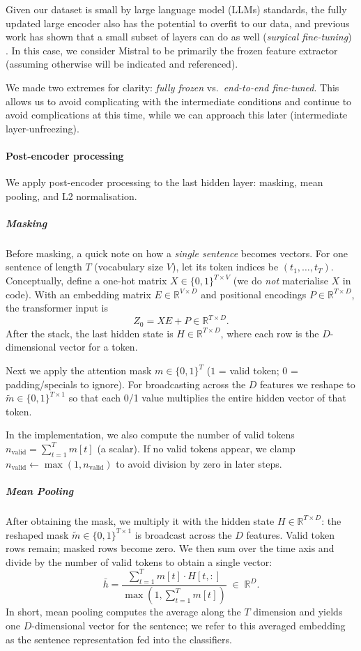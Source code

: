 \documentclass[12pt]{article}
\begin{document}
Given our dataset is small by large language model (LLMs) standards, the fully updated large encoder also has the potential to overfit to our data, and previous work has shown that a small subset of layers can do as well (\emph{surgical fine-tuning}) \cite{lodha2023surgical}. In this case, we consider Mistral to be primarily the frozen feature extractor (assuming otherwise will be indicated and referenced). 

We made two extremes for clarity: \emph{fully frozen} vs.\ \emph{end-to-end fine-tuned}. This allows us to avoid complicating with the intermediate conditions and continue to avoid complications at this time, while we can approach this later (intermediate layer-unfreezing).

\paragraph{Post-encoder processing}

We apply post-encoder processing to the last hidden layer: masking, mean pooling, and L2 normalisation.

%
\subparagraph{Masking}
Before masking, a quick note on how a \emph{single sentence} becomes vectors. For one sentence of length $T$ (vocabulary size $V$), let its token indices be $(t_1,\ldots,t_T)$. Conceptually, define a one-hot matrix $X \in \{0,1\}^{T \times V}$ (we do \emph{not} materialise $X$ in code). With an embedding matrix $E \in \mathbb{R}^{V \times D}$ and positional encodings $P \in \mathbb{R}^{T \times D}$, the transformer input is
\[
Z_0 = X E + P \in \mathbb{R}^{T \times D}.
\]
After the stack, the last hidden state is $H \in \mathbb{R}^{T \times D}$, where each row is the $D$-dimensional vector for a token.

Next we apply the attention mask $m \in \{0,1\}^{T}$ ($1$ = valid token; $0$ = padding/specials to ignore). For broadcasting across the $D$ features we reshape to $\tilde{m} \in \{0,1\}^{T \times 1}$ so that each 0/1 value multiplies the entire hidden vector of that token.

In the implementation, we also compute the number of valid tokens $n_{\mathrm{valid}} = \sum_{t=1}^{T} m[t]$ (a scalar). If no valid tokens appear, we clamp $n_{\mathrm{valid}} \leftarrow \max(1, n_{\mathrm{valid}})$ to avoid division by zero in later steps.

%
\subparagraph{Mean Pooling}
After obtaining the mask, we multiply it with the hidden state $H \in \mathbb{R}^{T \times D}$:
the reshaped mask $\tilde{m} \in \{0,1\}^{T \times 1}$ is broadcast across the $D$ features. Valid token rows remain; masked rows become zero. We then sum over the time axis and divide by the number of valid tokens to obtain a single vector:
\begin{equation}
\bar{h}
= \frac{\displaystyle \sum_{t=1}^{T} m[t] \cdot H[t,:]}
{\displaystyle \max\!\left(1, \sum_{t=1}^{T} m[t]\right)}
\;\in\; \mathbb{R}^{D}.
\end{equation}
In short, mean pooling computes the average along the $T$ dimension and yields one $D$-dimensional vector for the sentence; we refer to this averaged embedding as the sentence representation fed into the classifiers.
\end{document}
